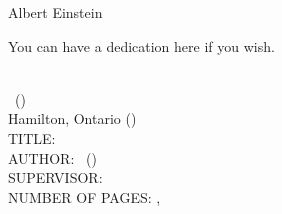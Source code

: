 \documentclass[
11pt, %
oneside, %
english, %
singlespacing, %
]{macthesis} %
\def\blankpage{%
      \clearpage%
      \thispagestyle{empty}%
      \addtocounter{page}{-1}%
      \null%
      \clearpage}
\begin{document}
\hfill\textemdash Albert Einstein

\blankpage
\clearpage



    You can have a dedication here if you wish.

\blankpage
\clearpage


\newpage
{} %
\setcounter{page}{2} %

\noindent %
\univname \\
\degreename\, (\the\year) \\
Hamilton, Ontario (\deptname) \\[1.5cm]
TITLE: \ttitle \\
AUTHOR: \authorname\,  %
(\univname)  \\
SUPERVISOR: \supname\, \\
NUMBER OF PAGES: \pageref{lastoffront}, \pageref{LastPage}  %

\clearpage

\end{document}
